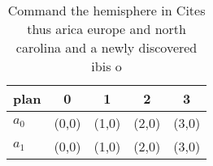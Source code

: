 \documentclass[a4paper]{article}
\begin{document}
\begin{table}
\begin{adjustbox}{width=0.5\columnwidth}
\begin{tabular}{|l|l|l|l|l|}
\hline
\textbf{plan} & \multicolumn{1}{c|}{\textbf{0}} & \multicolumn{1}{c|}{\textbf{1}} & \multicolumn{1}{c|}{\textbf{2}} & \multicolumn{1}{c|}{\textbf{3}} \\ \hline
\textbf{$a_0$}  & (0,0) & (1,0) & (2,0) & (3,0) \\ \hline
\textbf{$a_1$}  & (0,0) & (1,0) & (2,0) & (3,0) \\ \hline
\end{tabular}
\end{adjustbox}
\caption{Command the hemisphere in Cites thus arica europe and north carolina and a newly discovered ibis o 
}
\end{table}
\end{document}
